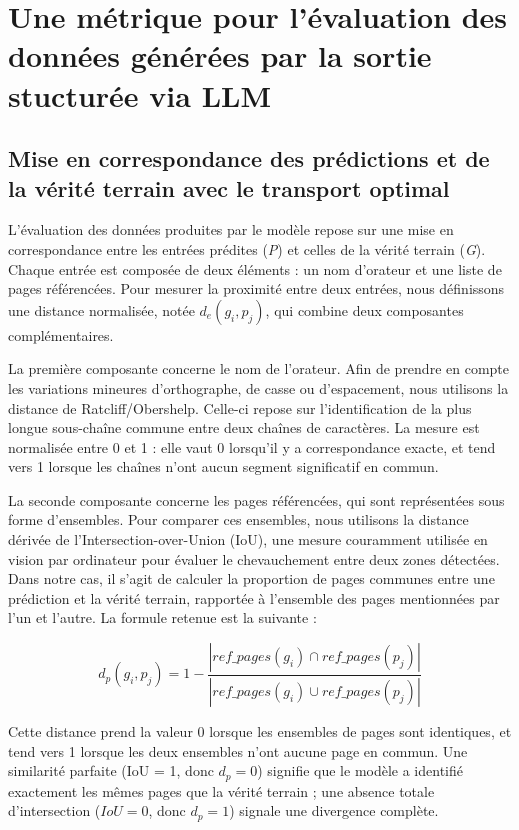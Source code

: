 \section[Une métrique d'évaluation]{Une métrique pour l'évaluation des données générées par la sortie stucturée via LLM}

\subsection{Mise en correspondance des prédictions et de la vérité terrain avec le transport optimal}

L’évaluation des données produites par le modèle repose sur une mise en correspondance entre les entrées prédites (\emph{P}) et celles de la vérité terrain (\emph{G}). Chaque entrée est composée de deux éléments : un nom d’orateur et une liste de pages référencées. Pour mesurer la proximité entre deux entrées, nous définissons une distance normalisée, notée $d_e(g_i, p_j)$, qui combine deux composantes complémentaires.

La première composante concerne le nom de l’orateur. Afin de prendre en compte les variations mineures d’orthographe, de casse ou d’espacement, nous utilisons la distance de Ratcliff/Obershelp. Celle-ci repose sur l’identification de la plus longue sous-chaîne commune entre deux chaînes de caractères. La mesure est normalisée entre 0 et 1 : elle vaut 0 lorsqu’il y a correspondance exacte, et tend vers 1 lorsque les chaînes n’ont aucun segment significatif en commun.

La seconde composante concerne les pages référencées, qui sont représentées sous forme d’ensembles. Pour comparer ces ensembles, nous utilisons la distance dérivée de l’Intersection-over-Union (IoU), une mesure couramment utilisée en vision par ordinateur pour évaluer le chevauchement entre deux zones détectées. Dans notre cas, il s’agit de calculer la proportion de pages communes entre une prédiction et la vérité terrain, rapportée à l’ensemble des pages mentionnées par l’un et l’autre. La formule retenue est la suivante :

$$
d_p(g_i, p_j) = 1 - \frac{|ref\_pages(g_i) \cap ref\_pages(p_j)|}{|ref\_pages(g_i) \cup ref\_pages(p_j)|}
$$

Cette distance prend la valeur 0 lorsque les ensembles de pages sont identiques, et tend vers 1 lorsque les deux ensembles n’ont aucune page en commun. Une similarité parfaite (IoU = 1, donc $d_p = 0$) signifie que le modèle a identifié exactement les mêmes pages que la vérité terrain ; une absence totale d’intersection ($IoU = 0$, donc $d_p = 1$) signale une divergence complète.

